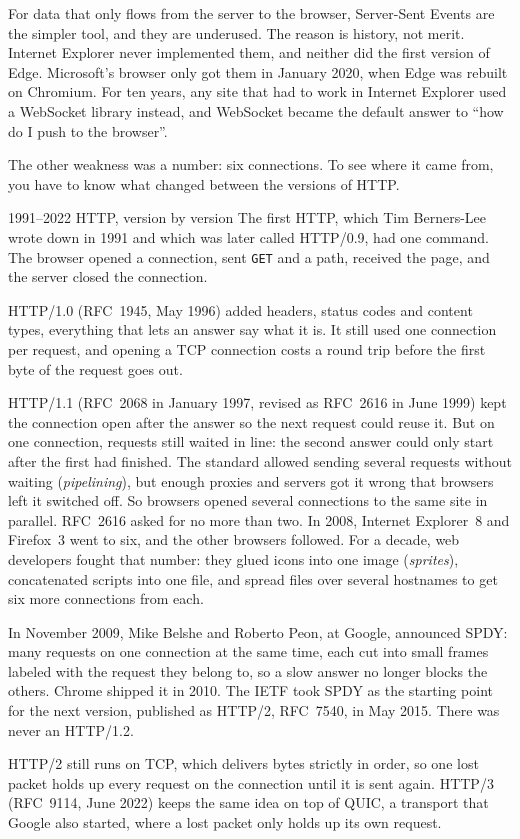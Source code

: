 For data that only flows from the server to the browser, Server-Sent Events are
the simpler tool, and they are underused. The reason is history, not merit.
Internet Explorer never implemented them, and neither did the first version of
Edge. Microsoft's browser only got them in January 2020, when Edge was rebuilt
on Chromium. For ten years, any site that had to work in Internet Explorer used
a WebSocket library instead, and WebSocket became the default answer to ``how do
I push to the browser''.

The other weakness was a number: six connections. To see where it came from,
you have to know what changed between the versions of HTTP.

\begin{history}{1991--2022 \textperiodcentered{} HTTP, version by version}
The first HTTP, which Tim Berners-Lee wrote down in 1991 and which was later
called HTTP/0.9, had one command. The browser opened a connection, sent
\texttt{GET} and a path, received the page, and the server closed the
connection.

HTTP/1.0 (RFC~1945, May 1996) added headers, status codes and content types,
everything that lets an answer say what it is. It still used one connection per
request, and opening a TCP connection costs a round trip before the first byte
of the request goes out.

HTTP/1.1 (RFC~2068 in January 1997, revised as RFC~2616 in June 1999) kept the
connection open after the answer so the next request could reuse it. But on one
connection, requests still waited in line: the second answer could only start
after the first had finished. The standard allowed sending several requests
without waiting (\emph{pipelining}), but enough proxies and servers got it
wrong that browsers left it switched off. So browsers opened several connections
to the same site in parallel. RFC~2616 asked for no more than two. In 2008,
Internet Explorer~8 and Firefox~3 went to six, and the other browsers followed.
For a decade, web developers fought that number: they glued icons into one image
(\emph{sprites}), concatenated scripts into one file, and spread files over
several hostnames to get six more connections from each.

In November 2009, Mike Belshe and Roberto Peon, at Google, announced SPDY: many
requests on one connection at the same time, each cut into small frames
labeled with the request they belong to, so a slow answer no longer blocks the
others. Chrome shipped it in 2010. The IETF took SPDY as the starting point for
the next version, published as HTTP/2, RFC~7540, in May 2015. There was never
an HTTP/1.2.

HTTP/2 still runs on TCP, which delivers bytes strictly in order, so one lost
packet holds up every request on the connection until it is sent again.
HTTP/3 (RFC~9114, June 2022) keeps the same idea on top of QUIC, a transport
that Google also started, where a lost packet only holds up its own request.
\end{history}

